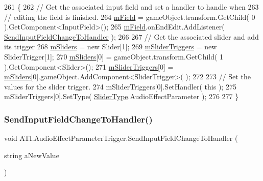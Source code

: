 \begin{DoxyCode}
261         \{
262             \textcolor{comment}{// Get the associated input field and set a handler to handle when}
263             \textcolor{comment}{// editing the field is finished.}
264             \hyperlink{class_a_t_i_1_1_audio_effect_parameter_trigger_af2d8e3ab407c8e1eb216fd67976ac0c8}{mField} = gameObject.transform.GetChild( 0 ).GetComponent<InputField>();
265             \hyperlink{class_a_t_i_1_1_audio_effect_parameter_trigger_af2d8e3ab407c8e1eb216fd67976ac0c8}{mField}.onEndEdit.AddListener( \hyperlink{class_a_t_i_1_1_audio_effect_parameter_trigger_a3f60059b95efae2e486d505c8a703547}{SendInputFieldChangeToHandler} 
      );
266 
267             \textcolor{comment}{// Get the associated slider and add its trigger }
268             \hyperlink{class_a_t_i_1_1_slider_handler_a038a487fbd701cb786e77c210830be76}{mSliders} = \textcolor{keyword}{new} Slider[1];
269             \hyperlink{class_a_t_i_1_1_slider_handler_a20208bc52a906cf87aa9df8e5fb2c636}{mSliderTriggers} = \textcolor{keyword}{new} SliderTrigger[1];
270             \hyperlink{class_a_t_i_1_1_slider_handler_a038a487fbd701cb786e77c210830be76}{mSliders}[0] = gameObject.transform.GetChild( 1 ).GetComponent<Slider>();
271             \hyperlink{class_a_t_i_1_1_slider_handler_a20208bc52a906cf87aa9df8e5fb2c636}{mSliderTriggers}[0] = \hyperlink{class_a_t_i_1_1_slider_handler_a038a487fbd701cb786e77c210830be76}{mSliders}[0].gameObject.AddComponent<SliderTrigger>(
      );
272 
273             \textcolor{comment}{// Set the values for the slider trigger.}
274             mSliderTriggers[0].SetHandler( \textcolor{keyword}{this} );
275             mSliderTriggers[0].SetType( \hyperlink{class_a_t_i_ac4c6056a99cbd16ff0d292d33b038b9b}{SliderType}.AudioEffectParameter );
276 
277         \}
\end{DoxyCode}
\mbox{\label{class_a_t_i_1_1_audio_effect_parameter_trigger_a3f60059b95efae2e486d505c8a703547}} 
\subsubsection{\texorpdfstring{Send\+Input\+Field\+Change\+To\+Handler()}{SendInputFieldChangeToHandler()}}
{\footnotesize\ttfamily void A\+T\+I.\+Audio\+Effect\+Parameter\+Trigger.\+Send\+Input\+Field\+Change\+To\+Handler (\begin{DoxyParamCaption}\item[{string}]{a\+New\+Value }\end{DoxyParamCaption})\hspace{0.3cm}{\ttfamily [private]}}



